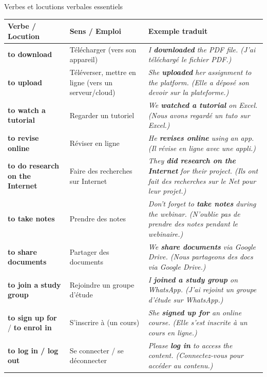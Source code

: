 \documentclass[11pt]{article}
\newcommand{\eng}[1]{\ifmmode\text{\textit{#1}}\else\begingroup\selectlanguage{english}\itshape #1\endgroup\fi}
\begin{document}
\begin{propriete}{Verbes et locutions verbales essentiels}
\begin{center}
\begin{tabularx}{\linewidth}{|l|X|X|}
\hline
\rowcolor{popblueL} \textbf{Verbe / Locution} & \textbf{Sens / Emploi} & \textbf{Exemple traduit} \\
\hline
\textbf{to download} & Télécharger (vers son appareil) & \eng{I \textbf{downloaded} the PDF file.} (J'ai téléchargé le fichier PDF.) \\
\textbf{to upload} & Téléverser, mettre en ligne (vers un serveur/cloud) & \eng{She \textbf{uploaded} her assignment to the platform.} (Elle a déposé son devoir sur la plateforme.) \\
\textbf{to watch a tutorial} & Regarder un tutoriel & \eng{We \textbf{watched a tutorial} on Excel.} (Nous avons regardé un tuto sur Excel.) \\
\textbf{to revise online} & Réviser en ligne & \eng{He \textbf{revises online} using an app.} (Il révise en ligne avec une appli.) \\
\textbf{to do research on the Internet} & Faire des recherches sur Internet & \eng{They \textbf{did research on the Internet} for their project.} (Ils ont fait des recherches sur le Net pour leur projet.) \\
\textbf{to take notes} & Prendre des notes & \eng{Don't forget to \textbf{take notes} during the webinar.} (N'oublie pas de prendre des notes pendant le webinaire.) \\
\textbf{to share documents} & Partager des documents & \eng{We \textbf{share documents} via Google Drive.} (Nous partageons des docs via Google Drive.) \\
\textbf{to join a study group} & Rejoindre un groupe d'étude & \eng{I \textbf{joined a study group} on WhatsApp.} (J'ai rejoint un groupe d'étude sur WhatsApp.) \\
\textbf{to sign up for} / \textbf{to enrol in} & S'inscrire à (un cours) & \eng{She \textbf{signed up for} an online course.} (Elle s'est inscrite à un cours en ligne.) \\
\textbf{to log in / log out} & Se connecter / se déconnecter & \eng{Please \textbf{log in} to access the content.} (Connectez-vous pour accéder au contenu.) \\
\hline
\end{tabularx}
\end{center}
\end{propriete}
\end{document}
